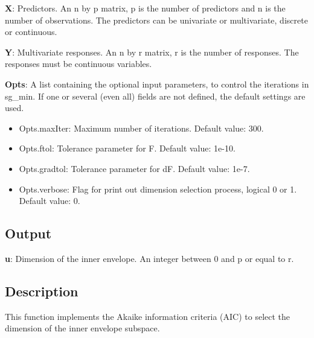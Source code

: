 \documentclass[a4paper,11pt,openany]{memoir}
\begin{document}
\begin{par}
\textbf{X}: Predictors. An n by p matrix, p is the number of predictors and n is the number of observations. The predictors can be univariate or multivariate, discrete or continuous.
\end{par} \vspace{1em}
\begin{par}
\textbf{Y}: Multivariate responses. An n by r matrix, r is the number of responses. The responses must be continuous variables.
\end{par} \vspace{1em}
\begin{par}
\textbf{Opts}: A list containing the optional input parameters, to control the iterations in sg\_min. If one or several (even all) fields are not defined, the default settings are used.
\end{par} \vspace{1em}
\begin{itemize}
\setlength{\itemsep}{-1ex}
   \item Opts.maxIter: Maximum number of iterations.  Default value: 300.
   \item Opts.ftol: Tolerance parameter for F.  Default value: 1e-10.
   \item Opts.gradtol: Tolerance parameter for dF.  Default value: 1e-7.
   \item Opts.verbose: Flag for print out dimension selection process, logical 0 or 1. Default value: 0.
\end{itemize}


\subsection*{Output}

\begin{par}
\textbf{u}: Dimension of the inner envelope. An integer between 0 and p or equal to r.
\end{par} \vspace{1em}


\subsection*{Description}

\begin{par}
This function implements the Akaike information criteria (AIC) to select the dimension of the inner envelope subspace.
\end{par} \vspace{1em}
\end{document}
